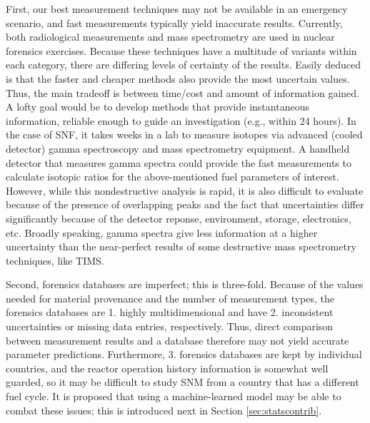 First, our best measurement techniques may not be available in an emergency
scenario, and fast measurements typically yield inaccurate results.  Currently,
both radiological measurements and mass spectrometry are used in nuclear
forensics exercises.  Because these techniques have a multitude of variants
within each category, there are differing levels of certainty of the results.
Easily deduced is that the faster and cheaper methods also provide the most
uncertain values. Thus, the main tradeoff is between time/cost and amount of
information gained. A lofty goal would be to develop methods that provide
instantaneous information, reliable enough to guide an investigation (e.g.,
within 24 hours).  In the case of \gls{SNF}, it takes weeks in a lab to measure
isotopes via advanced (cooled detector) gamma spectroscopy and mass
spectrometry equipment.  A handheld detector that measures gamma spectra could
provide the fast measurements to calculate isotopic ratios for the
above-mentioned fuel parameters of interest.  However, while this
nondestructive analysis is rapid, it is also difficult to evaluate because of
the presence of overlapping peaks and the fact that uncertainties differ
significantly because of the detector reponse, environment, storage,
electronics, etc. Broadly speaking, gamma spectra give less information at a
higher uncertainty than the near-perfect results of some destructive mass
spectrometry techniques, like TIMS.

Second, forensics databases are imperfect; this is three-fold.  Because of the
values needed for material provenance and the number of measurement types, the
forensics databases are 1. highly multidimensional and have 2. inconsistent
uncertainties or missing data entries, respectively. 
Thus, direct comparison between measurement results and a database therefore
may not yield accurate parameter predictions.  Furthermore, 3. forensics
databases are kept by individual countries, and the reactor operation history
information is somewhat well guarded, so it may be difficult to study \gls{SNM}
from a country that has a different fuel cycle.  It is proposed that using a
machine-learned model may be able to combat these issues; this is introduced
next in Section \ref{sec:statscontrib}. 
